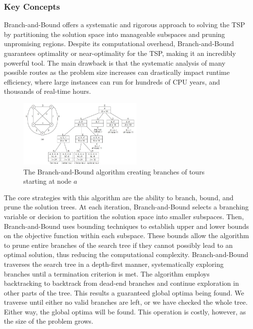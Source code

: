 \documentclass{article}
\begin{document}
\subsubsection{Key Concepts}
Branch-and-Bound offers a systematic and rigorous approach to solving the TSP by partitioning the solution space into manageable subspaces and pruning unpromising regions. Despite its computational overhead, Branch-and-Bound guarantees optimality or near-optimality for the TSP, making it an incredibly powerful tool. The main drawback is that the systematic analysis of many possible routes as the problem size increases can drastically impact runtime efficiency, where large instances can run for hundreds of CPU years, and thousands of real-time hours.
\begin{figure}[h]
    \centering
    \includegraphics[width=0.55\textwidth,keepaspectratio]{Images/bnb.jpg}
    \caption{The Branch-and-Bound algorithm creating branches of tours starting at node $a$}
    \label{fig:bandb}
\end{figure}

\noindent The core strategies with this algorithm are the ability to branch, bound, and prune the solution trees. At each iteration, Branch-and-Bound selects a branching variable or decision to partition the solution space into smaller subspaces. Then, Branch-and-Bound uses bounding techniques to establish upper and lower bounds on the objective function within each subspace. These bounds allow the algorithm to prune entire branches of the search tree if they cannot possibly lead to an optimal solution, thus reducing the computational complexity. Branch-and-Bound traverses the search tree in a depth-first manner, systematically exploring branches until a termination criterion is met. The algorithm employs backtracking to backtrack from dead-end branches and continue exploration in other parts of the tree. This results a guaranteed global optima being found. We traverse until either no valid branches are left, or we have checked the whole tree. Either way, the global optima will be found. This operation is costly, however, as the size of the problem grows.
\end{document}
